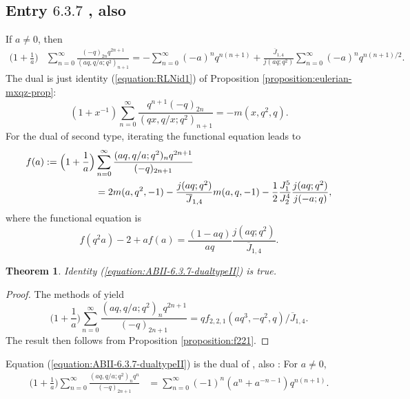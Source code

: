 \documentclass[12pt,reqno]{amsart}
\newtheorem{theorem}{Theorem}
\theoremstyle{remark}
\theoremstyle{definition}
\numberwithin{theorem}{section} \numberwithin{equation}{section}
\numberwithin{example}{section}
\begin{document}
{\subsection{Entry $6.3.7$ \cite{ABII}, also \cite[p. 2]{RLN}}
If $a\ne 0$, then
\begin{align}
\Big ( 1+\frac{1}{a}\Big )&\sum_{n=0}^{\infty}\frac{(-q)_{2n}q^{2n+1}}{(aq,q/a;q^2)_{n+1}}
=-\sum_{n=0}^{\infty}(-a)^{n}q^{n(n+1)} +\frac{\overline{J}_{1,4}}{j(aq;q^2)}\sum_{n=0}^{\infty}(-a)^{n}q^{n(n+1)/2}.\label{equation:ABII-6.3.7}
\end{align}
The dual is just identity (\ref{equation:RLNid1}) of  Proposition \ref{proposition:eulerian-mxqz-prop}:
\begin{equation*}
(1+x^{-1})\sum_{n= 0}^{\infty}\frac{q^{n+1}(-q)_{2n}}{(qx,q/x;q^2)_{n+1}}=-m(x,q^2,q).
\end{equation*}
For the dual of second type, iterating the functional equation leads to
\begin{align}
f(a):=\Big ( 1+\frac{1}{a}\Big )&\sum_{n=0}^{\infty}\frac{(aq,q/a;q^2)_nq^{2n+1}}{(-q)_{2n+1}}\label{equation:ABII-6.3.7-dualtypeII}\\
&=2m(a,q^2,-1)-\frac{j(aq;q^2)}{\overline{J}_{1,4}}m(a,q,-1)
 -\frac{1}{2}\frac{J_1^5}{J_2^4}\frac{j(aq;q^2)}{j(-a;q)},\notag
\end{align}
where the functional equation is
\begin{equation}
f(q^2a)-2+af(a)=\frac{(1-aq)}{aq}\frac{j(aq;q^2)}{\overline{J}_{1,4}}.
\end{equation}
\begin{theorem}
Identity (\ref{equation:ABII-6.3.7-dualtypeII}) is true.
\end{theorem}
\begin{proof} The methods of \cite{L} yield
\begin{equation}
\Big ( 1+\frac{1}{a}\Big )\sum_{n=0}^{\infty}\frac{(aq,q/a;q^2)_nq^{2n+1}}{(-q)_{2n+1}}=qf_{2,2,1}(aq^3,-q^2,q)/\overline{J}_{1,4}.
\end{equation}
The result then follows from Proposition \ref{proposition:f221}.
\end{proof}
Equation ({\ref{equation:ABII-6.3.7-dualtypeII}}) is the dual of  \cite[Entry $5.4.4$]{ABII}, also \cite[p. 15]{RLN}:
For $a\ne0$,
\begin{align}
\Big ( 1+\frac{1}{a}\Big )\sum_{n=0}^{\infty}\frac{(aq,q/a;q^2)_nq^{n}}{(-q)_{2n+1}}
&=\sum_{n=0}^{\infty}(-1)^n (a^n+a^{-n-1})q^{n(n+1)}\label{equation:ABII-5.4.4}.
\end{align}

}
\end{document}
